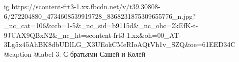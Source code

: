  
 
 
 
 

\ifcmt
  ig https://scontent-frt3-1.xx.fbcdn.net/v/t39.30808-6/272204880_4734608539919728_8368231875309655776_n.jpg?_nc_cat=106&ccb=1-5&_nc_sid=b9115d&_nc_ohc=2kEfK-t-9JUAX9QBxN2&_nc_ht=scontent-frt3-1.xx&oh=00_AT-3Lg5x45AhBK8dbUDlLG_X3UEokCMeRIoAQtVh1v_SZQ&oe=61EED34C
  @caption @label 3: С братьями Сашей и Колей
\fi
